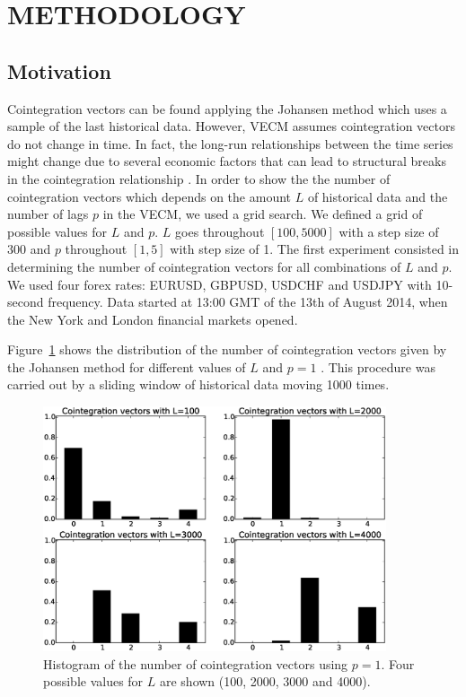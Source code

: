 \section{\uppercase{Methodology}} \label{sec:methodology}
\subsection{Motivation} \label{sec:proposal}

Cointegration vectors can be found applying the Johansen method which uses a
sample of the last historical data. However, VECM assumes cointegration vectors do not change in time.
In fact, the long-run relationships between the time series might change due to
several economic factors that can lead to structural breaks in the cointegration
relationship \cite{gregoryETal1996}. 
In order to show the the number of cointegration vectors which depends on 
the amount $L$ of historical data and the number of lags $p$ in the VECM, we used a grid search. We defined a grid of possible values for $L$ and $p$. $L$ goes throughout $[100,5000]$ with a step size of 300 and $p$  throughout $[1,5]$ with step size of 1. The first experiment consisted in determining the number of cointegration vectors for all combinations of $L$ and $p$.
We used four forex rates: EURUSD, GBPUSD, USDCHF and USDJPY with 10-second frequency. Data started at 13:00 GMT of the 13th of August 2014,
when the New York and London financial markets opened.

Figure~\ref{fig:hists} shows the distribution of the number of cointegration vectors 
given by the Johansen method for different values of $L$ and $p=1$ . This procedure was carried out by a sliding window of historical data moving 1000 times.



\begin{figure}[!h]
  \centering
  \includegraphics[width=0.9\textwidth]{img/histCointVectors-offset20520-p-1-freq-10s}
  \caption{Histogram of the number of cointegration vectors using $p=1$. Four
  possible values for $L$ are shown (100, 2000, 3000 and 4000).}
  \label{fig:hists}
\end{figure}

